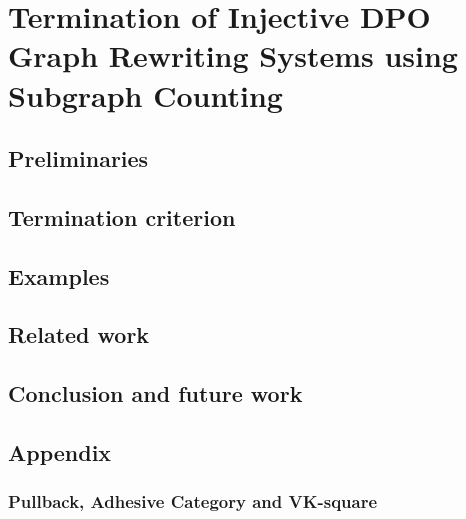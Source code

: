 \documentclass{report}
\begin{document}
\chapter{Termination of Injective DPO Graph Rewriting
Systems using Subgraph Counting}
\label{chap:subgraph_counting}

\label{sec:intro}


\section{Preliminaries} 
\label{sec:pre} 


 
 
\section{Termination criterion}
\label{sec:termination} 

 

\section{Examples}
\label{sec:examples}


  
\section{Related work}
\label{sec:related_work} 


\section{Conclusion and future work}
\label{sec:conclusion} 


\section{Appendix}
\subsection{Pullback, Adhesive Category and VK-square}

\end{document}
